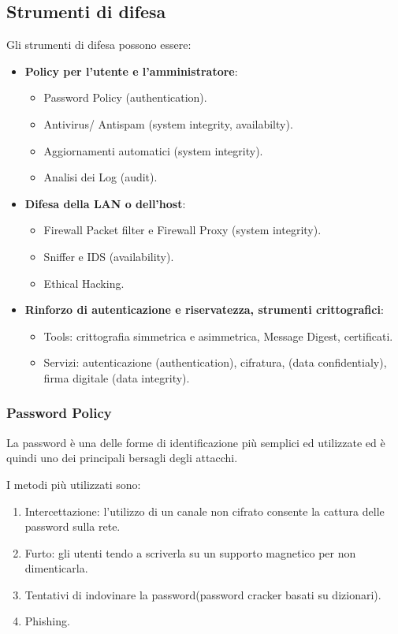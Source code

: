     \subsection{Strumenti di difesa}
        Gli strumenti di difesa possono essere:
        \begin{itemize}
            \item \textbf{Policy per l'utente e l'amministratore}:
            \begin{itemize}
                \item Password Policy (authentication).
                \item Antivirus/ Antispam (system integrity, availabilty).
                \item Aggiornamenti automatici (system integrity).
                \item Analisi dei Log (audit).
            \end{itemize}
            \item \textbf{Difesa della LAN o dell'host}:
            \begin{itemize}
                \item Firewall Packet filter e Firewall Proxy (system integrity).
                \item Sniffer e IDS (availability).
                \item Ethical Hacking.                
            \end{itemize}
            \item \textbf{Rinforzo di autenticazione e riservatezza, strumenti crittografici}:
            \begin{itemize}
                \item Tools: crittografia simmetrica e asimmetrica, Message Digest, certificati.
                \item Servizi: autenticazione (authentication), cifratura, (data confidentialy), firma digitale (data integrity).
            \end{itemize}
        \end{itemize}

        \subsubsection{Password Policy}
            La password è una delle forme di identificazione più semplici ed utilizzate ed è quindi uno dei principali bersagli degli attacchi.
        
            I metodi più utilizzati sono:
            \begin{enumerate}
                \item Intercettazione: l'utilizzo di un canale non cifrato consente la cattura delle password sulla rete.
                \item Furto: gli utenti tendo a scriverla su un supporto magnetico per non dimenticarla.
                \item Tentativi di indovinare la password(password cracker basati su dizionari).
                \item Phishing.
            \end{enumerate}

